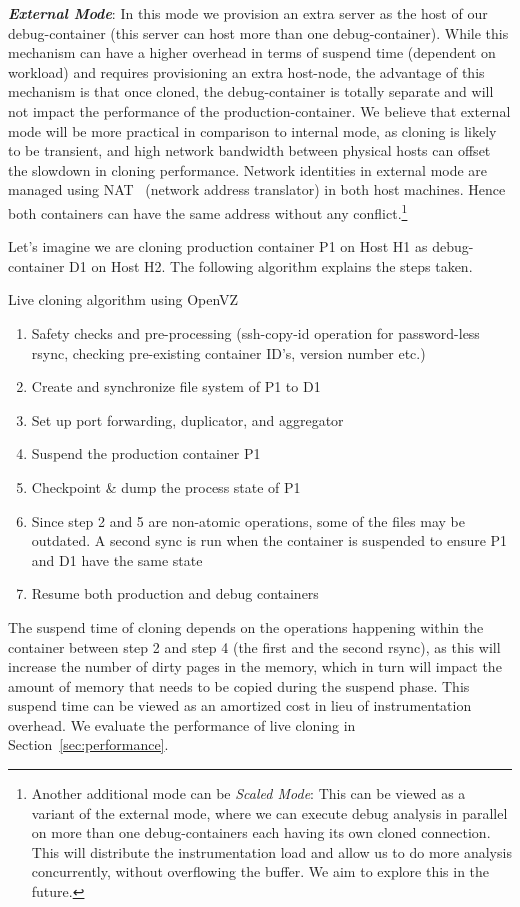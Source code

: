 \noindent
\textbf{\textit{External Mode}}: In this mode we provision an extra server as the host of our debug-container (this server can host more than one debug-container). 
While this mechanism can have a higher overhead in terms of suspend time (dependent on workload) and requires provisioning an extra host-node, the advantage of this mechanism is that once cloned, the debug-container is totally separate and will not impact the performance of the production-container.
We believe that external mode will be more practical in comparison to internal mode, as cloning is likely to be transient, and high network bandwidth between physical hosts can offset the slowdown in cloning performance. 
Network identities in external mode are managed using NAT~\cite{nat} (network address translator) in both host machines. 
Hence both containers can have the same address without any conflict.\footnote{Another additional mode can be \textit{Scaled Mode}: This can be viewed as a variant of the external mode, where we can execute debug analysis in parallel on more than one debug-containers each having its own cloned connection. This will distribute the instrumentation load and allow us to do more analysis concurrently, without overflowing the buffer. We aim to explore this in the future.}


Let's imagine we are cloning production container P1 on Host H1 as debug-container D1 on Host H2. 
The following algorithm explains the steps taken.

\begin{algorithm}[ht!]
  \caption{Live cloning algorithm using OpenVZ} 
  \label{algCloning}
  \begin{enumerate}[topsep=0pt,itemsep=-1ex,partopsep=1ex,parsep=1ex]
  \item Safety checks and pre-processing (ssh-copy-id operation for password-less rsync, checking pre-existing container ID's, version number etc.) 
  \item Create and synchronize file system of P1 to D1  
  \item Set up port forwarding, duplicator, and aggregator
  \item Suspend the production container P1
  \item Checkpoint \& dump the process state of P1
  \item Since step 2 and 5 are non-atomic operations, some of the files may be outdated.
A second sync is run when the container is suspended to ensure P1 and D1 have the same state
  \item Resume both production and debug containers
  \end{enumerate}
\end{algorithm}


The suspend time of cloning depends on the operations happening within the container between step 2 and step 4 (the first and the second rsync), as this will increase the number of dirty pages in the memory, which in turn will impact the amount of memory that needs to be copied during the suspend phase.
This suspend time can be viewed as an amortized cost in lieu of instrumentation overhead.
We evaluate the performance of live cloning in Section~\ref{sec:performance}.